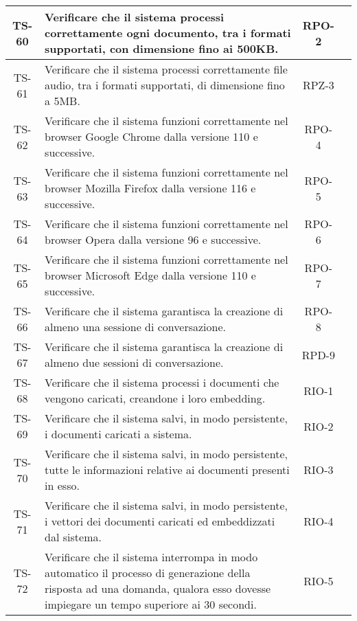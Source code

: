 \begin{xltabular}{\textwidth}{| c | X | c | c |}
    \hline
    TS-60 & Verificare che il sistema processi correttamente ogni documento, tra i formati supportati, con dimensione fino ai 500KB. & RPO-2 & \textcolor{xmarkcolor}{} \\
    \hline
    TS-61 & Verificare che il sistema processi correttamente file audio, tra i formati supportati, di dimensione fino a 5MB. & RPZ-3 & \textcolor{xmarkcolor}{} \\
    \hline
    TS-62 & Verificare che il sistema funzioni correttamente nel browser Google Chrome dalla versione 110 e successive. & RPO-4 & \textcolor{xmarkcolor}{} \\
    \hline
    TS-63 & Verificare che il sistema funzioni correttamente nel browser Mozilla Firefox dalla versione 116 e successive. & RPO-5 & \textcolor{xmarkcolor}{} \\
    \hline
    TS-64 & Verificare che il sistema funzioni correttamente nel browser Opera dalla versione 96 e successive. & RPO-6 & \textcolor{xmarkcolor}{} \\
    \hline
    TS-65 & Verificare che il sistema funzioni correttamente nel browser Microsoft Edge dalla versione 110 e successive. & RPO-7 & \textcolor{xmarkcolor}{} \\
    \hline
    TS-66 & Verificare che il sistema garantisca la creazione di almeno una sessione di conversazione. & RPO-8 & \textcolor{xmarkcolor}{} \\
    \hline
    TS-67 & Verificare che il sistema garantisca la creazione di almeno due sessioni di conversazione. & RPD-9 & \textcolor{xmarkcolor}{} \\
    \hline
    TS-68 & Verificare che il sistema processi i documenti che vengono caricati, creandone i loro embedding. & RIO-1 & \textcolor{xmarkcolor}{} \\
    \hline
    TS-69 & Verificare che il sistema salvi, in modo persistente, i documenti caricati a sistema. & RIO-2 & \textcolor{xmarkcolor}{} \\
    \hline
    TS-70 & Verificare che il sistema salvi, in modo persistente, tutte le informazioni relative ai documenti presenti in esso. & RIO-3 & \textcolor{xmarkcolor}{} \\
    \hline
    TS-71 & Verificare che il sistema salvi, in modo persistente, i vettori dei documenti caricati ed embeddizzati dal sistema. & RIO-4 & \textcolor{xmarkcolor}{} \\
    \hline
    TS-72 & Verificare che il sistema interrompa in modo automatico il processo di generazione della risposta ad una domanda, qualora esso dovesse impiegare un tempo superiore ai 30 secondi. & RIO-5 & \textcolor{xmarkcolor}{} \\

\end{xltabular}
